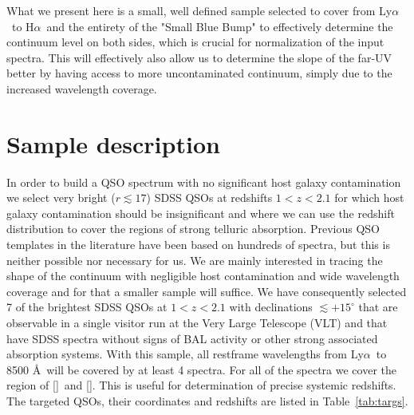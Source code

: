 \documentclass{aa}    %
\newcommand{\Tab}[1]{Table~\ref{tab:#1}}
\newcommand{\tab}[1]{\Tab{#1}}
\newcommand{\sectlabel}[1]{\label{sect:#1}}
\newcommand{\lya}{Ly$\alpha$}
\newcommand{\ha}{H$\alpha$}
\newcommand{\oii}{[\ion{O}{ii}]}
\newcommand{\oiii}{[\ion{O}{iii}]}
\begin{document}
What we present here is a small, well defined sample selected to cover from \lya~to \ha~and the entirety of the "Small Blue Bump" to effectively determine the continuum level on both sides, which is crucial for normalization of the input spectra. This will effectively also allow us to determine the slope of the far-UV better by having access to more uncontaminated continuum, simply due to the increased wavelength coverage. 


\section{Sample description}   \sectlabel{sample}


In order to build a QSO spectrum with no significant host galaxy contamination we select very bright ($r \lesssim 17$) SDSS QSOs at redshifts $1 < z < 2.1$ for which host galaxy contamination should be insignificant and where we can use the redshift distribution to cover the regions of strong telluric absorption. Previous QSO templates in the literature have been based on hundreds of spectra, but this is neither possible nor necessary for us. We are mainly interested in tracing the shape of the continuum with negligible host contamination and wide wavelength coverage and for that a smaller sample will suffice. We have consequently selected 7 of the brightest SDSS QSOs at $1 < z < 2.1$ with declinations $\lesssim +15^\circ$ that are observable in a single visitor run at the Very Large Telescope (VLT) and that have SDSS spectra without signs of BAL activity or other strong associated absorption systems. With this sample, all restframe wavelengths from \lya~to 8500 \AA~will be covered by at least 4 spectra. For all of the spectra we cover the region of \oii~and \oiii. This is useful for determination of precise systemic redshifts. The targeted QSOs, their coordinates and redshifts are listed in \tab{targs}.
\end{document}
